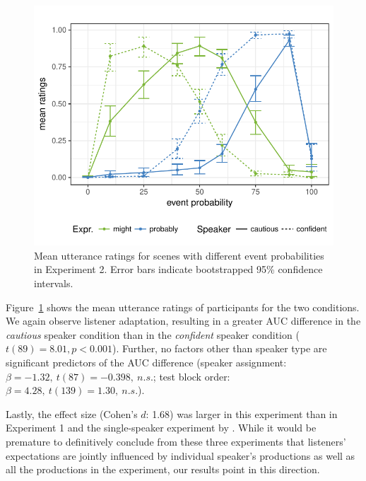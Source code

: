 \documentclass[10pt,letterpaper]{article}
\begin{document}
\begin{figure}
\includegraphics[width=\columnwidth]{plots/exp2-results.pdf}
\caption{Mean utterance ratings for scenes with different event probabilities in Experiment 2. Error bars indicate bootstrapped 95\% confidence intervals. \label{fig:exp2-results}}
\end{figure}

Figure~\ref{fig:exp2-results} shows the mean utterance ratings of participants for the two conditions. We again observe listener adaptation, resulting in a greater AUC difference in the \emph{cautious} speaker 
condition than in the \emph{confident} speaker condition ($t(89)=8.01, p < 0.001$). Further, no factors
other than speaker type are significant predictors of the AUC difference 
(speaker assignment: $\beta=-1.32, \ t(87)=-0.398, \ n.s.$; test block order:  $\beta=4.28, \ t(139)=1.30, \ n.s.$).

Lastly, the effect size (Cohen's $d$: 1.68) was larger in this experiment than in Experiment 1 and the single-speaker 
experiment by . While it would be premature to definitively conclude from these three experiments that listeners' expectations are jointly influenced
by individual speaker's productions as well as all the productions in the experiment, our results point in this direction. 
\end{document}
